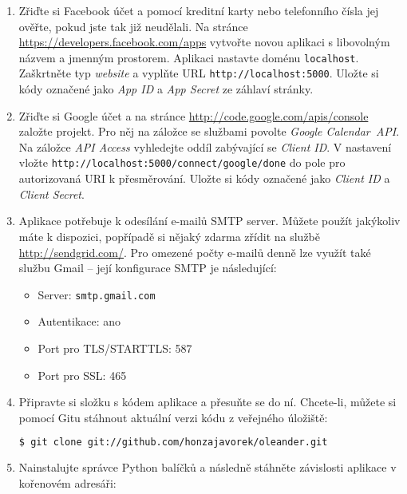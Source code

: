 \documentclass[12pt,oneside,final]{fithesis2}
\begin{document}
\begin{enumerate}
    \item Zřiďte si Facebook účet a pomocí kreditní karty nebo telefonního čísla jej ověřte, pokud jste tak již neudělali. Na stránce \url{https://developers.facebook.com/apps} vytvořte novou aplikaci s libovolným názvem a jmenným prostorem. Aplikaci nastavte doménu {\tt localhost}. Zaškrtněte typ \emph{website} a vyplňte URL {\tt http://localhost:5000}. Uložte si kódy označené jako \emph{App ID} a \emph{App Secret} ze záhlaví stránky.

    \item Zřiďte si Google účet a na stránce \url{http://code.google.com/apis/console} založte projekt. Pro něj na záložce se službami povolte \emph{Google Calendar~API}. Na záložce \emph{API Access} vyhledejte oddíl zabývající se \emph{Client ID}. V nastavení vložte {\tt http://localhost:5000/connect/google/done} do pole pro autorizovaná URI k přesměrování. Uložte si kódy označené jako \emph{Client ID} a \emph{Client Secret}.

    \item Aplikace potřebuje k odesílání e-mailů SMTP server. Můžete použít jakýkoliv máte k dispozici, popřípadě si nějaký zdarma zřídit na službě \url{http://sendgrid.com/}. Pro omezené počty e-mailů denně lze využít také službu Gmail -- její konfigurace SMTP je následující:

        \begin{itemize}
            \item Server: {\tt smtp.gmail.com}
            \item Autentikace: ano
            \item Port pro TLS/STARTTLS: 587
            \item Port pro SSL: 465
        \end{itemize}

    \item Připravte si složku s kódem aplikace a přesuňte se do ní. Chcete-li, můžete si pomocí Gitu stáhnout aktuální verzi kódu z veřejného úložiště:

        \begin{lstlisting}[language=bash]
$ git clone git://github.com/honzajavorek/oleander.git
        \end{lstlisting}

    \item Nainstalujte správce Python balíčků a následně stáhněte závislosti aplikace v kořenovém adresáři:


\end{enumerate}
\end{document}
